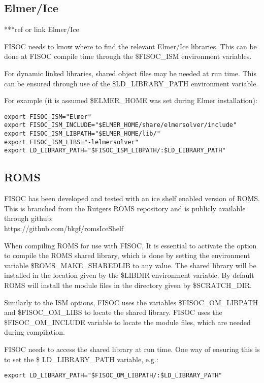 \documentclass[12pt]{article}
\begin{document}
\subsection{Elmer/Ice}
\label{sec:Elmer}
***ref or link Elmer/Ice

FISOC needs to know where to find the relevant Elmer/Ice libraries.  
This can be done at FISOC compile time through the 
\$FISOC\_ISM
environment variables.  

For dynamic linked libraries, shared object files may be needed at run time.  
This can be ensured through use of 
the \$LD\_LIBRARY\_PATH environment variable. 

For example (it is assumed \$ELMER\_HOME was set during Elmer installation):
\begin{lstlisting}
export FISOC_ISM="Elmer"
export FISOC_ISM_INCLUDE="$ELMER_HOME/share/elmersolver/include"
export FISOC_ISM_LIBPATH="$ELMER_HOME/lib/"
export FISOC_ISM_LIBS="-lelmersolver"
export LD_LIBRARY_PATH="$FISOC_ISM_LIBPATH/:$LD_LIBRARY_PATH"
\end{lstlisting}


\subsection{ROMS}
\label{sec:ROMS}

FISOC has been developed and tested with an ice shelf enabled version of ROMS. 
This is branched from the Rutgers ROMS repository and is publicly available 
through github: \\
https://github.com/bkgf/romsIceShelf

When compiling ROMS for use with FISOC, It is essential to activate the option 
to compile the ROMS shared library, which 
is done by setting the environment variable \$ROMS\_MAKE\_SHAREDLIB to any value. 
The shared library will be installed in the location given by the 
 \$LIBDIR environment variable. 
By default ROMS will install the module files in the directory given by 
 \$SCRATCH\_DIR.  

Similarly to the ISM options, FISOC uses the variables \$FISOC\_OM\_LIBPATH and
 \$FISOC\_OM\_LIBS to locate the shared library.
FISOC uses the  \$FISOC\_OM\_INCLUDE variable to locate the module files, 
which are needed during compilation.

FISOC needs to access the shared library at run time.  One way of ensuring this 
is to set the \$ LD\_LIBRARY\_PATH variable, e.g.:
\begin{lstlisting}
export LD_LIBRARY_PATH="$FISOC_OM_LIBPATH/:$LD_LIBRARY_PATH"
\end{lstlisting}
\end{document}

